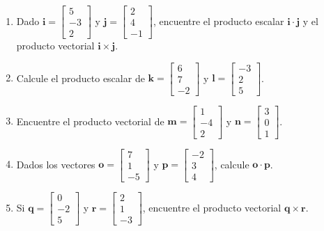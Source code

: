 \documentclass[10pt,a4paper]{article}
\begin{document}
\begin{enumerate}[resume]
    \item Dado $\mathbf{i} = \begin{bmatrix} 5 \\ -3 \\ 2 \end{bmatrix}$ y $\mathbf{j} = \begin{bmatrix} 2 \\ 4 \\ -1 \end{bmatrix}$, encuentre el producto escalar $\mathbf{i} \cdot \mathbf{j}$ y el producto vectorial $\mathbf{i} \times \mathbf{j}$.

    \item Calcule el producto escalar de $\mathbf{k} = \begin{bmatrix} 6 \\ 7 \\ -2 \end{bmatrix}$ y $\mathbf{l} = \begin{bmatrix} -3 \\ 2 \\ 5 \end{bmatrix}$.

    \item Encuentre el producto vectorial de $\mathbf{m} = \begin{bmatrix} 1 \\ -4 \\ 2 \end{bmatrix}$ y $\mathbf{n} = \begin{bmatrix} 3 \\ 0 \\ 1 \end{bmatrix}$.

    \item Dados los vectores $\mathbf{o} = \begin{bmatrix} 7 \\ 1 \\ -5 \end{bmatrix}$ y $\mathbf{p} = \begin{bmatrix} -2 \\ 3 \\ 4 \end{bmatrix}$, calcule $\mathbf{o} \cdot \mathbf{p}$.

    \item Si $\mathbf{q} = \begin{bmatrix} 0 \\ -2 \\ 5 \end{bmatrix}$ y $\mathbf{r} = \begin{bmatrix} 2 \\ 1 \\ -3 \end{bmatrix}$, encuentre el producto vectorial $\mathbf{q} \times \mathbf{r}$.


\end{enumerate}
\end{document}
